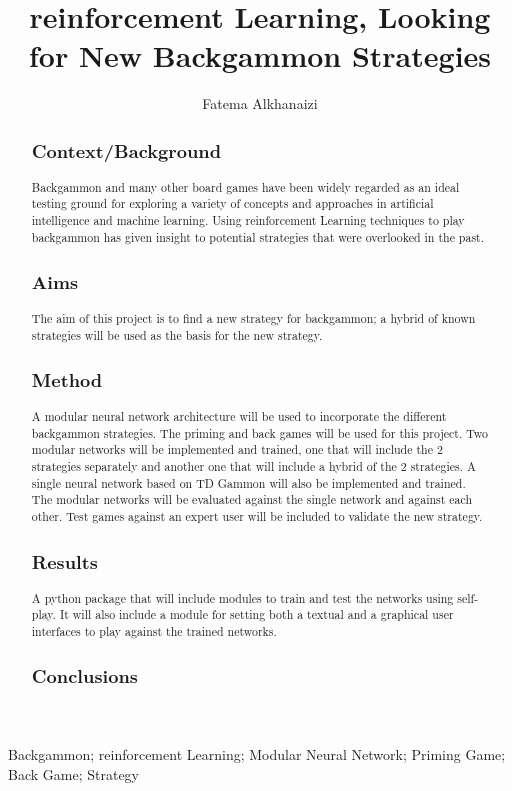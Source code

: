 \documentclass[12pt,a4paper]{article}
\title{reinforcement Learning, Looking for New Backgammon Strategies}
\author{Fatema Alkhanaizi}
\date{}
\begin{document}
\maketitle

\begin{abstract}
\subsection{Context/Background}
Backgammon and many other board games have been widely regarded as an ideal testing ground for exploring a variety of concepts and approaches in artificial intelligence and machine learning. Using reinforcement Learning techniques to play backgammon has given insight to potential strategies that were overlooked in the past.
\subsection{Aims}
The aim of this project is to find a new strategy for backgammon; a hybrid of known strategies will be used as the basis for the new strategy. 
\subsection{Method}
A modular neural network architecture will be used to incorporate the different backgammon strategies. The priming and back games will be used for this project. Two modular networks will be implemented and trained, one that will include the 2 strategies separately and another one that will include a hybrid of the 2 strategies. A single neural network based on TD Gammon will also be implemented and trained. The modular networks will be evaluated against the single network and against each other. Test games against an expert user will be included to validate the new strategy.
\subsection{Results}
A python package that will include modules to train and test the networks using self-play. It will also include a module for setting both a textual and a graphical user interfaces to play against the trained networks. 
\subsection{Conclusions}
\end{abstract}

\begin{keywords}
Backgammon; reinforcement Learning; Modular Neural Network; Priming Game; Back Game; Strategy
\end{keywords}
\end{document}
